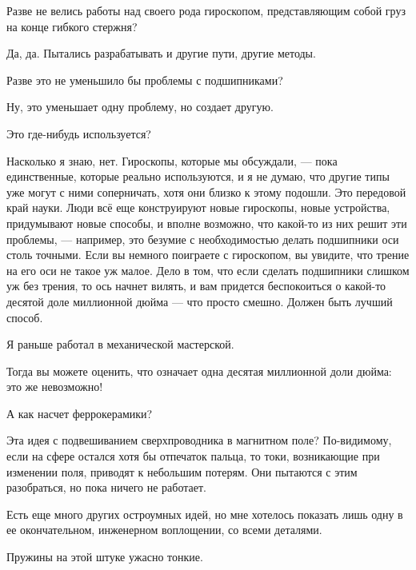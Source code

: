 \documentclass[11pt,oneside]{article}
\begin{document}
Разве не велись работы над своего рода гироскопом, представляющим собой груз на конце гибкого стержня?\par

Да, да. Пытались разрабатывать и другие пути, другие методы.\par

Разве это не уменьшило бы проблемы с подшипниками?\par

Ну, это уменьшает одну проблему, но создает другую.\par

Это где-нибудь используется?\par

Насколько я знаю, нет. Гироскопы, которые мы обсуждали, --- пока единственные, которые реально используются, и я не думаю, что другие типы уже могут с ними соперничать, хотя они близко к этому подошли. Это передовой край науки. Люди всё еще конструируют новые гироскопы, новые устройства, придумывают новые способы, и вполне возможно, что какой-то из них решит эти проблемы, --- например, это безумие с необходимостью делать подшипники оси столь точными. Если вы немного поиграете с гироскопом, вы увидите, что трение на его оси не такое уж малое. Дело в том, что если сделать подшипники слишком уж без трения, то ось начнет вилять, и вам придется беспокоиться о какой-то десятой доле миллионной дюйма --- что просто смешно. Должен быть лучший способ.\par

Я раньше работал в механической мастерской.\par

Тогда вы можете оценить, что означает одна десятая миллионной доли дюйма: это же невозможно!\par

А как насчет феррокерамики?\par

Эта идея с подвешиванием сверхпроводника в магнитном поле? По-видимому, если на сфере остался хотя бы отпечаток пальца, то токи, возникающие при изменении поля, приводят к небольшим потерям. Они пытаются с этим разобраться, но пока ничего не работает.\par

Есть еще много других остроумных идей, но мне хотелось показать лишь одну в ее окончательном, инженерном воплощении, со всеми деталями.\par

Пружины на этой штуке ужасно тонкие.\par
\end{document}
